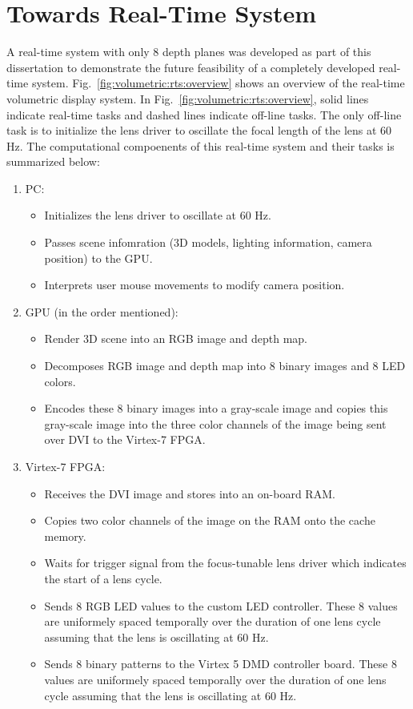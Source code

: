 \section{Towards Real-Time System}
\label{sec:volumetric:rts}


A real-time system with only 8 depth planes was developed as part of this dissertation to demonstrate the future feasibility of a completely developed real-time system.
Fig.~\ref{fig:volumetric:rts:overview} shows an overview of the real-time volumetric display system.
In Fig.~\ref{fig:volumetric:rts:overview}, solid lines indicate real-time tasks and dashed lines indicate off-line tasks.
The only off-line task is to initialize the lens driver to oscillate the focal length of the lens at 60 Hz. 
The computational compoenents of this real-time system and their tasks is summarized below:

\begin{enumerate}
    \item PC:
    \begin{itemize}
        \item Initializes the lens driver to oscillate at 60 Hz. 
        \item Passes scene infomration (3D models, lighting information, camera position) to the GPU.
        \item Interprets user mouse movements to modify camera position.
    \end{itemize}
    \item GPU (in the order mentioned):
    \begin{itemize}
        \item Render 3D scene into an RGB image and depth map.
        \item Decomposes RGB image and depth map into 8 binary images and 8 LED colors.
        \item Encodes these 8 binary images into a gray-scale image and copies this gray-scale image into the three color channels of the image being sent over DVI to the Virtex-7 FPGA.
    \end{itemize}
    \item Virtex-7 FPGA:
    \begin{itemize}
        \item Receives the DVI image and stores into an on-board RAM.
        \item Copies two color channels of the image on the RAM onto the cache memory.
        \item Waits for trigger signal from the focus-tunable lens driver which indicates the start of a lens cycle.
        \item Sends 8 RGB LED values to the custom LED controller. These 8 values are uniformely spaced temporally over the duration of one lens cycle assuming that the lens is oscillating at 60 Hz.
        \item Sends 8 binary patterns to the Virtex 5 DMD controller board. These 8 values are uniformely spaced temporally over the duration of one lens cycle assuming that the lens is oscillating at 60 Hz.
    \end{itemize}
\end{enumerate}

